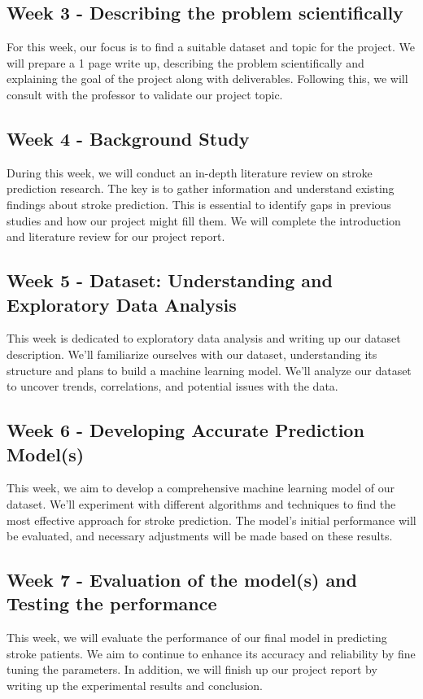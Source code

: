 \documentclass[11pt]{article}
\begin{document}
\subsection*{Week 3 - Describing the problem scientifically}
For this week, our focus is to find a suitable dataset and topic for the project. We will prepare a 1 page write up, describing the problem scientifically and explaining the goal of the project along with deliverables. Following this, we will consult with the professor to validate our project topic.

\subsection*{Week 4 - Background Study}
During this week, we will conduct an in-depth literature review on stroke prediction research. The key is to gather information and understand existing findings about stroke prediction. This is essential to identify gaps in previous studies and how our project might fill them. We will complete the introduction and literature review for our project report.  

\subsection*{Week 5 - Dataset: Understanding and Exploratory Data Analysis}
This week is dedicated to exploratory data analysis and writing up our dataset description. We’ll familiarize ourselves with our dataset, understanding its structure and plans to build a machine learning model. We’ll analyze our dataset to uncover trends, correlations, and potential issues with the data.

\subsection*{Week 6 - Developing Accurate Prediction Model(s)}
This week, we aim to develop a comprehensive machine learning model of our dataset. We’ll experiment with different algorithms and techniques to find the most effective approach for stroke prediction. The model’s initial performance will be evaluated, and necessary adjustments will be made based on these results.  

\subsection*{Week 7 - Evaluation of the model(s) and Testing the performance}
This week, we will evaluate the performance of our final model in predicting stroke patients. We aim to continue to enhance its accuracy and reliability by fine tuning the parameters. In addition, we will finish up our project report by writing up the experimental results and conclusion.
\end{document}
